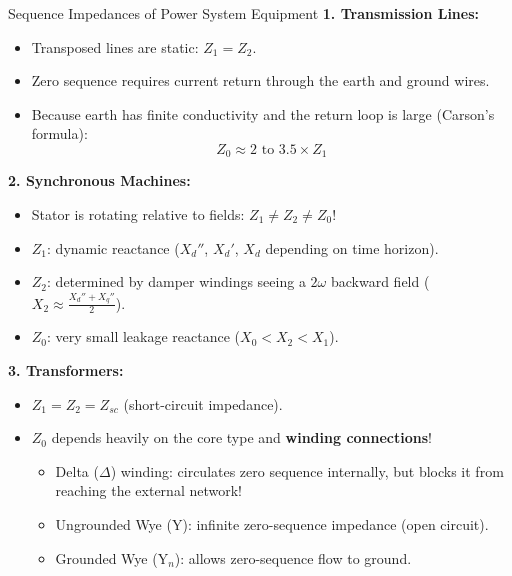 \begin{frame}[allowframebreaks]{Sequence Impedances of Power System Equipment}
    \textbf{1. Transmission Lines:}
    \begin{itemize}
        \item Transposed lines are static: $Z_1 = Z_2$.
        \item Zero sequence requires current return through the earth and ground wires.
        \item Because earth has finite conductivity and the return loop is large (Carson's formula):
        \begin{equation}
            Z_0 \approx 2 \text{ to } 3.5 \times Z_1
        \end{equation}
    \end{itemize}

    \textbf{2. Synchronous Machines:}
    \begin{itemize}
        \item Stator is rotating relative to fields: $Z_1 \neq Z_2 \neq Z_0$!
        \item $Z_1$: dynamic reactance ($X_d''$, $X_d'$, $X_d$ depending on time horizon).
        \item $Z_2$: determined by damper windings seeing a $2\omega$ backward field ($X_2 \approx \frac{X_d'' + X_q''}{2}$).
        \item $Z_0$: very small leakage reactance ($X_0 < X_2 < X_1$).
    \end{itemize}

    \textbf{3. Transformers:}
    \begin{itemize}
        \item $Z_1 = Z_2 = Z_{sc}$ (short-circuit impedance).
        \item $Z_0$ depends heavily on the core type and \alert{\textbf{winding connections}}!
        \begin{itemize}
            \item Delta ($\Delta$) winding: circulates zero sequence internally, but blocks it from reaching the external network!
            \item Ungrounded Wye (Y): infinite zero-sequence impedance (open circuit).
            \item Grounded Wye ($\text{Y}_n$): allows zero-sequence flow to ground.
        \end{itemize}
    \end{itemize}
\end{frame}

